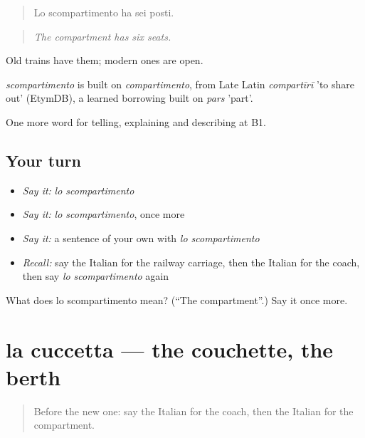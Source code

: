\begin{quote}
Lo scompartimento ha sei posti.
\end{quote}

\begin{quote}
\emph{The compartment has six seats.}
\end{quote}

Old trains have them; modern ones are open.

\begin{cousinweb}
\emph{scompartimento} is built on \emph{compartimento}, from Late Latin \emph{compartīrī} 'to share out' (EtymDB), a learned borrowing built on \emph{pars} 'part'.
\end{cousinweb}

\begin{grammarlens}[title={What you've built}]
One more word for telling, explaining and describing at B1.
\end{grammarlens}

\subsection*{Your turn}
\begin{itemize}
\raggedright
  \item \emph{Say it:} \emph{lo scompartimento}
  \item \emph{Say it:} \emph{lo scompartimento}, once more
  \item \emph{Say it:} a sentence of your own with \emph{lo scompartimento}
  \item \emph{Recall:} say the Italian for the railway carriage, then the Italian for the coach, then say \emph{lo scompartimento} again
\end{itemize}

\begin{tcolorbox}[breakable,colback=teal!4,colframe=teal!35!black,title={Before you move on}]
What does lo scompartimento mean? (\textquotedblleft{}The compartment\textquotedblright{}.) Say it once more.
\end{tcolorbox}
\section[la cuccetta]{la cuccetta — the couchette, the berth}

\label{lesson:IT-C419-cuccetta}



\begin{quote}
Before the new one: say the Italian for the coach, then the Italian for the compartment.
\end{quote}

